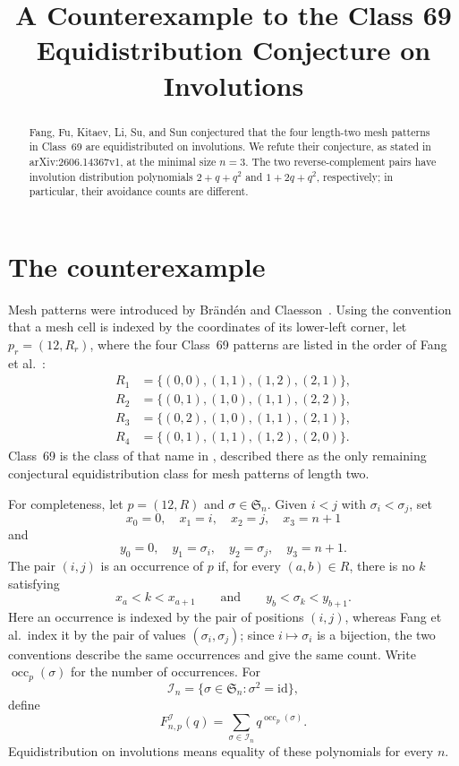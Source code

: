 \documentclass[11pt]{amsart}
\title[Class 69 on involutions]
{A Counterexample to the Class 69 Equidistribution Conjecture on Involutions}
\date{}
\theoremstyle{remark}
\newcommand{\Sn}{\mathfrak{S}_n}
\newcommand{\In}{\mathcal{I}_n}
\newcommand{\occ}{\operatorname{occ}}
\begin{document}
\begin{abstract}
Fang, Fu, Kitaev, Li, Su, and Sun conjectured that the four length-two
mesh patterns in Class~69 are equidistributed on involutions. We
refute their conjecture, as stated in arXiv:2606.14367v1, at the
minimal size $n=3$. The two reverse-complement pairs have involution
distribution polynomials $2+q+q^2$ and $1+2q+q^2$, respectively; in
particular, their avoidance counts are different.
\end{abstract}

\maketitle

\section{The counterexample}

Mesh patterns were introduced by Br\"and\'en and Claesson~\cite{BC11}.
Using the convention that a mesh cell is indexed by the coordinates of
its lower-left corner, let $p_r=(12,R_r)$, where the four Class~69
patterns are listed in the order of Fang et al.~\cite[Conjecture~1]{FFKLSS26}:
\[
\begin{aligned}
R_1&=\{(0,0),(1,1),(1,2),(2,1)\},\\
R_2&=\{(0,1),(1,0),(1,1),(2,2)\},\\
R_3&=\{(0,2),(1,0),(1,1),(2,1)\},\\
R_4&=\{(0,1),(1,1),(1,2),(2,0)\}.
\end{aligned}
\]
Class~69 is the class of that name in \cite[Remark~1.3]{FFKLSS26},
described there as the only remaining conjectural equidistribution class
for mesh patterns of length two.

For completeness, let $p=(12,R)$ and $\sigma\in\Sn$. Given
$i<j$ with $\sigma_i<\sigma_j$, set
\[
 x_0=0,\quad x_1=i,\quad x_2=j,\quad x_3=n+1
\]
and
\[
 y_0=0,\quad y_1=\sigma_i,\quad y_2=\sigma_j,\quad y_3=n+1.
\]
The pair $(i,j)$ is an occurrence of $p$ if, for every $(a,b)\in R$,
there is no $k$ satisfying
\[
 x_a<k<x_{a+1}
 \qquad\text{and}\qquad
 y_b<\sigma_k<y_{b+1}.
\]
Here an occurrence is indexed by the pair of positions $(i,j)$, whereas
Fang et al.\ index it by the pair of values $(\sigma_i,\sigma_j)$; since
$i\mapsto\sigma_i$ is a bijection, the two conventions describe the same
occurrences and give the same count.
Write $\occ_p(\sigma)$ for the number of occurrences. For
\[
 \In=\{\sigma\in\Sn:\sigma^2=\mathrm{id}\},
\]
define
\[
 F^{\mathcal I}_{n,p}(q)
 =\sum_{\sigma\in\In}q^{\occ_p(\sigma)}.
\]
Equidistribution on involutions means equality of these polynomials
for every $n$.
\end{document}
